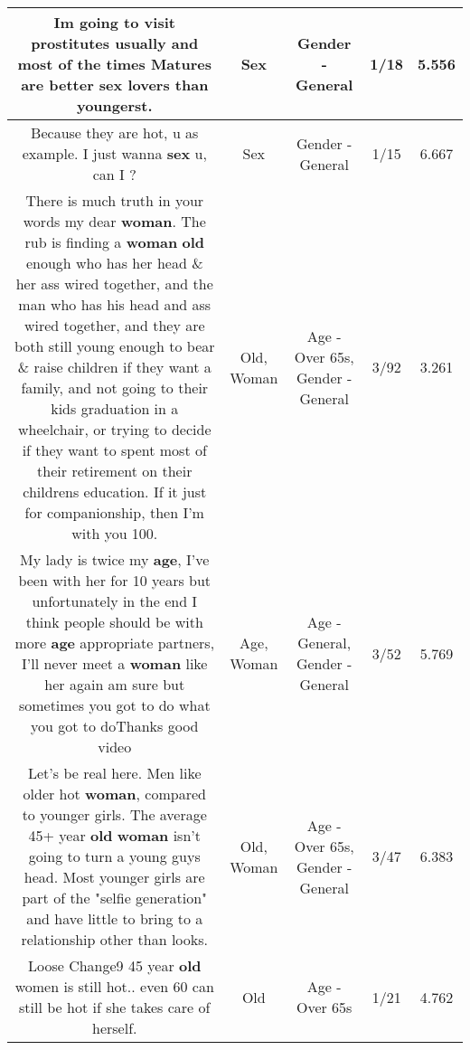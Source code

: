 \documentclass[11pt]{article}
\newlength\mylength
\begin{document}
\begin{center}
\begin{longtable}{|C{.65\mylength}|C{.30\mylength}|C{.12\mylength}|C{.12\mylength}|C{.12\mylength}|}
  \small Im going to visit prostitutes usually and most of the times Matures are better \textbf{sex} lovers than youngerst.\normalsize   & Sex & Gender - General & 1/18 & 5.556 \\  \hline
  \small Because they are hot, u as example. I just wanna \textbf{sex} u, can I ?\normalsize   & Sex & Gender - General & 1/15 & 6.667 \\  \hline
  \small There is much truth in your words my dear \textbf{woman}. The rub is finding a \textbf{woman} \textbf{old} enough who has her head \& her ass wired together, and the man who has his head and ass wired together, and they are both still young enough to bear \& raise children if they want a family, and not going to their kids graduation in a wheelchair, or trying to decide if they want to spent most of their retirement on their childrens education. If it just for companionship, then I'm with you 100.\normalsize   & Old, Woman & Age - Over 65s, Gender - General & 3/92 & 3.261 \\  \hline
  \small My lady is twice my \textbf{age}, I've been with her for 10 years but unfortunately in the end I think people should be with more \textbf{age} appropriate partners, I'll never meet a \textbf{woman} like her again am sure but sometimes you got to do what you got to doThanks good video\normalsize   & Age, Woman & Age - General, Gender - General & 3/52 & 5.769 \\  \hline
  \small Let's be real here. Men like older hot \textbf{woman}, compared to younger girls. The average 45+ year \textbf{old} \textbf{woman} isn't going to turn a young guys head. Most younger girls are part of the "selfie generation" and have little to bring to a relationship other than looks.\normalsize   & Old, Woman & Age - Over 65s, Gender - General & 3/47 & 6.383 \\  \hline
  \small Loose Change9 45 year \textbf{old} women is still hot.. even 60 can still be hot if she takes care of herself.\normalsize   & Old & Age - Over 65s & 1/21 & 4.762 \\  \hline

\end{longtable}
\end{center}
\end{document}
